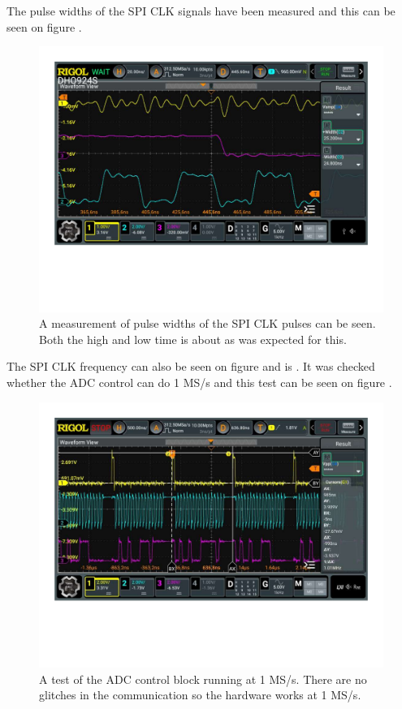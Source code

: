 The pulse widths of the SPI CLK signals have been measured and this can be seen on figure .
\begin{figure}[H]
    \centering
    \includegraphics[clip, trim=0 150 0 0, width=1\textwidth]{Appendix/Figures/A_ADC_CONTROL_PULSEWIDTH.pdf}
    \caption{A measurement of pulse widths of the SPI CLK pulses can be seen. Both the high and low time is about  as was expected for this.}
    \label{fig:A_ADC_CONTROL_SPICLKWIDTH}
\end{figure}

The SPI CLK frequency can also be seen on figure  and is . It was checked whether the ADC control can do 1 MS/s and this test can be seen on figure .

\begin{figure}[H]
    \centering
    \includegraphics[clip, trim=0 150 0 0, width=1\textwidth]{Appendix/Figures/7_2_8_ADC_CONTROL_1MEGSAMPLE_MEAS.pdf}
    \caption{A test of the ADC control block running at 1 MS/s. There are no glitches in the communication so the hardware works at 1 MS/s.}
    \label{fig:A_ADC_CONTROL_1MSS}
\end{figure}